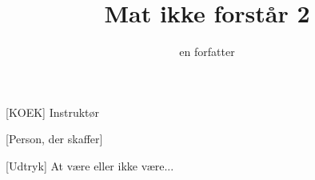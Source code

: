 \documentclass[a4paper,11pt]{article}
\title{Mat ikke forstår 2}
\author{en forfatter}
\begin{document}
\maketitle

\begin{roles}
[KOEK] Instruktør
\end{roles}

\begin{props}
[Person, der skaffer]
\end{props}


\begin{sketch}


[Udtryk] At være eller ikke være... 



\end{sketch}
\end{document}
